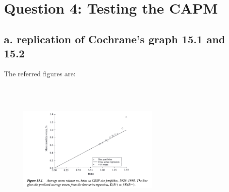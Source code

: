 \documentclass[]{article}
\title{}
\author{}
\begin{document}
	
	\maketitle
	
	
	\section*{Question 4: Testing the CAPM}
	\subsection*{a. replication of Cochrane's graph 15.1 and 15.2}
	
	The referred figures are:
	
\begin{figure}[H]
	\centering
	\includegraphics[width=7cm, height=7cm]{Cochrane_15_1}
	\caption{}
	\label{fig:cochrane_15_1}
\end{figure}
	
	
	
	
\end{document}
